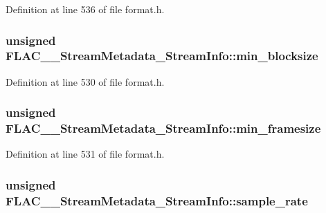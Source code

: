 Definition at line 536 of file format.\+h.

\subsubsection[{\texorpdfstring{min\+\_\+blocksize}{min_blocksize}}]{\setlength{\rightskip}{0pt plus 5cm}unsigned F\+L\+A\+C\+\_\+\+\_\+\+Stream\+Metadata\+\_\+\+Stream\+Info\+::min\+\_\+blocksize}\hypertarget{struct_f_l_a_c_____stream_metadata___stream_info_ad999bb6f695206464df8d76126812572}{}\label{struct_f_l_a_c_____stream_metadata___stream_info_ad999bb6f695206464df8d76126812572}


Definition at line 530 of file format.\+h.

\subsubsection[{\texorpdfstring{min\+\_\+framesize}{min_framesize}}]{\setlength{\rightskip}{0pt plus 5cm}unsigned F\+L\+A\+C\+\_\+\+\_\+\+Stream\+Metadata\+\_\+\+Stream\+Info\+::min\+\_\+framesize}\hypertarget{struct_f_l_a_c_____stream_metadata___stream_info_a4f9408c082ef8bb4f14a8da6e8e24fd4}{}\label{struct_f_l_a_c_____stream_metadata___stream_info_a4f9408c082ef8bb4f14a8da6e8e24fd4}


Definition at line 531 of file format.\+h.

\subsubsection[{\texorpdfstring{sample\+\_\+rate}{sample_rate}}]{\setlength{\rightskip}{0pt plus 5cm}unsigned F\+L\+A\+C\+\_\+\+\_\+\+Stream\+Metadata\+\_\+\+Stream\+Info\+::sample\+\_\+rate}\hypertarget{struct_f_l_a_c_____stream_metadata___stream_info_a127c95ed9ea6564191f57a1642e27c97}{}\label{struct_f_l_a_c_____stream_metadata___stream_info_a127c95ed9ea6564191f57a1642e27c97}



